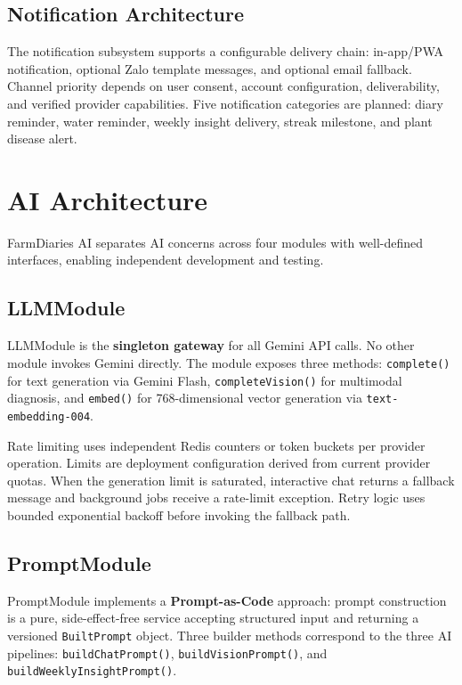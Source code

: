 \documentclass[conference]{IEEEtran}
\begin{document}
\subsection{Notification Architecture}

The notification subsystem supports a configurable delivery chain: in-app/PWA notification, optional Zalo template messages, and optional email fallback. Channel priority depends on user consent, account configuration, deliverability, and verified provider capabilities. Five notification categories are planned: diary reminder, water reminder, weekly insight delivery, streak milestone, and plant disease alert.

\section{AI Architecture}

FarmDiaries AI separates AI concerns across four modules with well-defined interfaces, enabling independent development and testing.

\subsection{LLMModule}

LLMModule is the \textbf{singleton gateway} for all Gemini API calls. No other module invokes Gemini directly. The module exposes three methods: \texttt{complete()} for text generation via Gemini Flash, \texttt{completeVision()} for multimodal diagnosis, and \texttt{embed()} for 768-dimensional vector generation via \texttt{text-embedding-004}.

Rate limiting uses independent Redis counters or token buckets per provider operation. Limits are deployment configuration derived from current provider quotas. When the generation limit is saturated, interactive chat returns a fallback message and background jobs receive a rate-limit exception. Retry logic uses bounded exponential backoff before invoking the fallback path.

\subsection{PromptModule}

PromptModule implements a \textbf{Prompt-as-Code} approach: prompt construction is a pure, side-effect-free service accepting structured input and returning a versioned \texttt{BuiltPrompt} object. Three builder methods correspond to the three AI pipelines: \texttt{buildChatPrompt()}, \texttt{buildVisionPrompt()}, and \texttt{buildWeeklyInsightPrompt()}.
\end{document}
